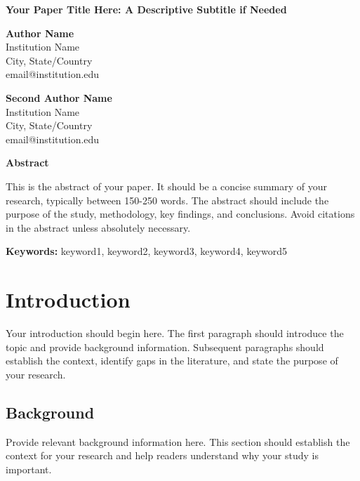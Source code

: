 \documentclass[12pt,letterpaper]{article}
\newcommand{\apaabstract}[1]{
    \begin{center}
        \textbf{Abstract}
    \end{center}
    \noindent #1
}
\newcommand{\apakeywords}[1]{
    \vspace{0.5em}
    \noindent\textbf{Keywords:} #1
}
\begin{document}
\begin{center}
    \textbf{Your Paper Title Here: A Descriptive Subtitle if Needed}
    
    \vspace{0.5em}
    
    \textbf{Author Name}\\
    Institution Name\\
    City, State/Country\\
    email@institution.edu
    
    \vspace{0.5em}
    
    \textbf{Second Author Name}\\
    Institution Name\\
    City, State/Country\\
    email@institution.edu
\end{center}

\vspace{1em}

\apaabstract{
    This is the abstract of your paper. It should be a concise summary of your research, typically between 150-250 words. The abstract should include the purpose of the study, methodology, key findings, and conclusions. Avoid citations in the abstract unless absolutely necessary.
}

\apakeywords{keyword1, keyword2, keyword3, keyword4, keyword5}

\vspace{1em}

\section{Introduction}

Your introduction should begin here. The first paragraph should introduce the topic and provide background information. Subsequent paragraphs should establish the context, identify gaps in the literature, and state the purpose of your research.

\subsection{Background}

Provide relevant background information here. This section should establish the context for your research and help readers understand why your study is important.
\end{document}
